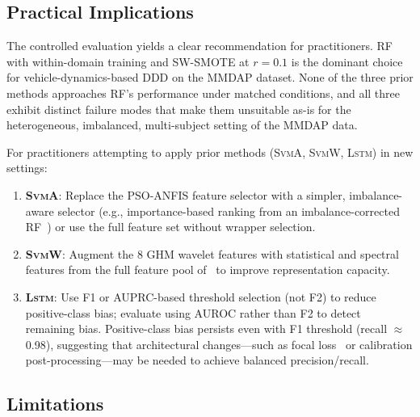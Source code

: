 \documentclass[lettersize,journal]{IEEEtran}
\newcommand{\Impl}[1]{\textsc{#1}}
\begin{document}
\subsection{Practical Implications}
\label{sec:practical}

The controlled evaluation yields a clear recommendation for practitioners.
RF with within-domain training and SW-SMOTE at $r = 0.1$ is the dominant choice for vehicle-dynamics-based DDD on the MMDAP dataset.
None of the three prior methods approaches RF's performance under matched conditions, and all three exhibit distinct failure modes that make them unsuitable as-is for the heterogeneous, imbalanced, multi-subject setting of the MMDAP data.

For practitioners attempting to apply prior methods (\Impl{SvmA}, \Impl{SvmW}, \Impl{Lstm}) in new settings:
\begin{enumerate}
\item \textbf{\Impl{SvmA}}: Replace the PSO-ANFIS feature selector with a simpler, imbalance-aware selector (e.g., importance-based ranking from an imbalance-corrected RF~\cite{breiman2001}) or use the full feature set without wrapper selection.
\item \textbf{\Impl{SvmW}}: Augment the 8 GHM wavelet features with statistical and spectral features from the full feature pool of~\cite{nakagama2026tiv} to improve representation capacity.
\item \textbf{\Impl{Lstm}}: Use F1 or AUPRC-based threshold selection (not F2) to reduce positive-class bias; evaluate using AUROC rather than F2 to detect remaining bias. Positive-class bias persists even with F1 threshold (recall $\approx$ 0.98), suggesting that architectural changes---such as focal loss~\cite{lin2017} or calibration post-processing---may be needed to achieve balanced precision/recall.
\end{enumerate}

\subsection{Limitations}
\label{sec:limitations}
\end{document}
